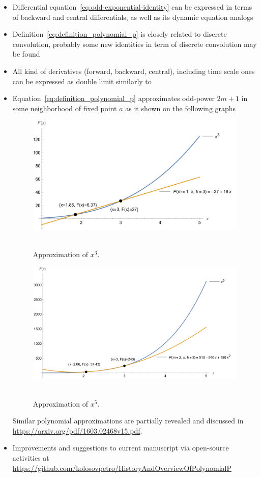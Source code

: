 \begin{itemize}
    \item Differential equation~\eqref{eq:odd-exponential-identity} can be expressed in terms of backward
    and central differentials, as well as its dynamic equation analogs~\cite{kolosov2016study}
    \item Definition~\eqref{eq:definition_polynomial_p} is closely related to discrete convolution, probably
    some new identities in term of discrete convolution may be found
    \item All kind of derivatives (forward, backward, central), including time scale ones can be expressed
    as double limit similarly to~\cite{kolosov_2024_10575485}
    \item Equation~\eqref{eq:definition_polynomial_p} approximates odd-power $2m+1$ in some neighborhood of fixed point
    $a$ as it shown on the following graphs
    \begin{figure}[H]
        \centering
        \includegraphics[width=1\textwidth]{images/n^3_approximation_m1_b3}
        ~\caption{Approximation of $x^3$.}\label{fig:approximation-n3}
    \end{figure}
    \begin{figure}[H]
        \centering
        \includegraphics[width=1\textwidth]{images/n^5_approximation_m2_b3}
        ~\caption{Approximation of $x^5$.}\label{fig:approximation-n5}
    \end{figure}
    Similar polynomial approximations are partially revealed and discussed
    in \url{https://arxiv.org/pdf/1603.02468v15.pdf}.
    \item Improvements and suggestions to current manuscript via open-source activities at
    \url{https://github.com/kolosovpetro/HistoryAndOverviewOfPolynomialP}
\end{itemize}
